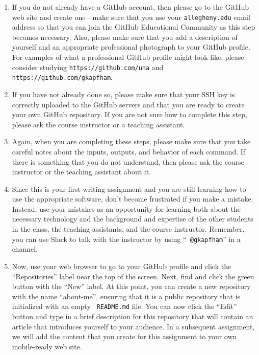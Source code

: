 \begin{enumerate}

  \itemsep 0em

  \item If you do not already have a GitHub account, then please go to the GitHub web site and create one---make
    sure that you use your {\tt allegheny.edu} email address so that you can join the GitHub Educational Community as
    this step becomes necessary. Also, please make sure that you add a description of yourself and an appropriate
    professional photograph to your GitHub profile. For examples of what a professional GitHub profile might look like,
    please consider studying {\tt https://github.com/una} and {\tt https://github.com/gkapfham}.

  \item If you have not already done so, please make sure that your SSH key is correctly uploaded to the GitHub servers
    and that you are ready to create your own GitHub repository. If you are not sure how to complete this step, please
    ask the course instructor or a teaching assistant.

  \item Again, when you are completing these steps, please make sure that you take careful notes about the inputs,
    outputs, and behavior of each command. If there is something that you do not understand, then please ask the course
    instructor or the teaching assistant about it.

  \item Since this is your first writing assignment and you are still learning how to use the appropriate software,
    don't become frustrated if you make a mistake. Instead, use your mistakes as an opportunity for learning both about
    the necessary technology and the background and expertise of the other students in the class, the teaching
    assistants, and the course instructor. Remember, you can use Slack to talk with the instructor by using ``{\tt
    @gkapfham}'' in a channel.

  \item Now, use your web browser to go to your GitHub profile and click the ``Repositories'' label near the top of the
    screen. Next, find and click the green button with the ``New'' label. At this point, you can create a new repository
    with the name ``about-me'', ensuring that it is a public repository that is initialized with an empty {\tt
    README.md} file. You can now click the ``Edit'' button and type in a brief description for this repository that will
    contain an article that introduces yourself to your audience. In a subsequent assignment, we will add the content
    that you create for this assignment to your own mobile-ready web site.


\end{enumerate}
